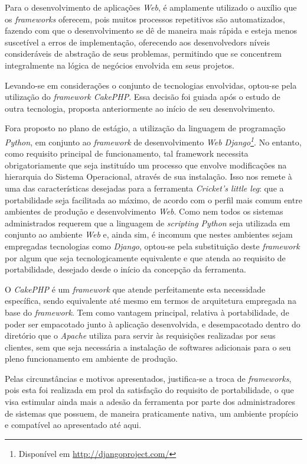 Para o desenvolvimento de aplicações \textit{Web}, é amplamente utilizado o auxílio que os \textit{frameworks} oferecem, pois muitos processos repetitivos são automatizados, fazendo com que o desenvolvimento se dê de maneira mais rápida e esteja menos suscetível a erros de implementação, oferecendo aos desenvolvedors níveis consideráveis de abstração de seus problemas, permitindo que se concentrem integralmente na lógica de negócios envolvida em seus projetos.

Levando-se em considerações o conjunto de tecnologias envolvidas, optou-se pela utilização do \textit{framework CakePHP}. Essa decisão foi guiada após o estudo de outra tecnologia, proposta anteriormente ao início de seu desenvolvimento.

Fora proposto no plano de estágio, a utilização da linguagem de programação \textit{Python}, em conjunto ao \textit{framework} de desenvolvimento \textit{Web Django\footnote{Disponível em \url{http://djangoproject.com/}}}. No entanto, como requisito principal de funcionamento, tal framework necessita obrigatoriamente que seja instituído um processo que envolve modificações na hierarquia do Sistema Operacional, através de sua instalação. Isso nos remete à uma das características desejadas para a ferramenta \textit{Cricket's little leg}: que a portabilidade seja facilitada ao máximo, de acordo com o perfil mais comum entre ambientes de produção e desenvolvimento \textit{Web}. Como nem todos os sistemas administrados requerem que a linguagem de \textit{scripting Python} seja utilizada em conjunto ao ambiente \textit{Web} e, ainda sim, é incomum que nestes ambientes sejam empregadas tecnologias como \textit{Django}, optou-se pela substituição deste \textit{framework} por algum que seja tecnologicamente equivalente e que atenda ao requisito de portabilidade, desejado desde o início da concepção da ferramenta.

O \textit{CakePHP} é um \textit{framework} que atende perfeitamente esta necessidade específica, sendo equivalente até mesmo em termos de arquitetura empregada na base do \textit{framework}. Tem como vantagem principal, relativa à portabilidade, de poder ser empacotado junto à aplicação desenvolvida, e desempacotado dentro do diretório que o \textit{Apache} utiliza para servir às requisições realizadas por seus clientes, sem que seja necessária a instalação de softwares adicionais para o seu pleno funcionamento em ambiente de produção.

Pelas circunstâncias e motivos apresentados, justifica-se a troca de \textit{frameworks}, pois esta foi realizada em prol da satisfação do requisito de portabilidade, o que visa estimular ainda mais a adesão da ferramenta por parte dos administradores de sistemas que possuem, de maneira praticamente nativa, um ambiente propício e compatível ao apresentado até aqui.

